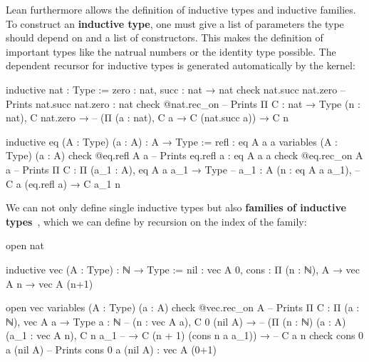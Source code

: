 Lean furthermore allows the definition of inductive types and inductive
families.
To construct an \textbf{inductive type}, one must give a list of parameters the type should
depend on and a list of constructors.
This makes the definition of important types like the natrual numbers or the identity
type possible.
The dependent recursor for inductive types is generated automatically by the kernel:
\begin{leancode}
inductive nat : Type :=
  zero : nat,
  succ : nat → nat
check nat.succ nat.zero -- Prints nat.succ nat.zero : nat
check @nat.rec_on -- Prints Π {C : nat → Type} (n : nat), C nat.zero →
                  --        (Π (a : nat), C a → C (nat.succ a)) → C n
\end{leancode}

\begin{leancode}
inductive eq (A : Type) (a : A) : A → Type :=
  refl : eq A a a
variables (A : Type) (a : A)
check @eq.refl A a -- Prints eq.refl a : eq A a a
check @eq.rec_on A a -- Prints Π {C : Π (a_1 : A), eq A a a_1 → Type}
                     --        {a_1 : A} (n : eq A a a_1),
                     --        C a (eq.refl a) → C a_1 n
\end{leancode}

We can not only define single inductive types but also \textbf{families of
inductive types}~\cite{inductive-families}, which we can define by recursion on
the index of the family:
\begin{leancode}
open nat

inductive vec (A : Type) : ℕ → Type :=
  nil : vec A 0,
  cons : Π (n : ℕ), A → vec A n → vec A (n+1)

open vec
variables (A : Type) (a : A)
check @vec.rec_on A -- Prints Π {C : Π (a : ℕ), vec A a → Type} {a : ℕ} 
                    --        (n : vec A a), C 0 (nil A) →
                    --        (Π (n : ℕ) (a : A) (a_1 : vec A n), C n a_1
                    --          → C (n + 1) (cons n a a_1)) →
                    --        C a n
check cons 0 a (nil A) -- Prints cons 0 a (nil A) : vec A (0+1)
\end{leancode}

